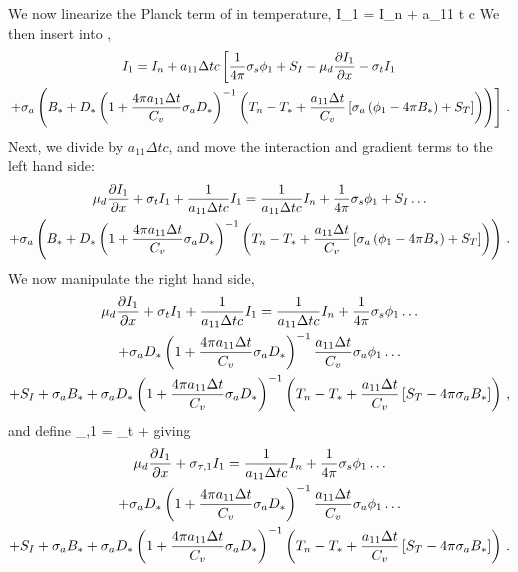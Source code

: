 We now linearize the Planck term of  in temperature,
\benum
I_1 = I_n + a_{11} \Delta t c  \pep
\label{eq:long_i_1_analytic}
\eenum
We then insert  into ,
\begin{multline}
I_1 = I_n + a_{11} \Delta t c \left[ \frac{1}{4\pi}\sigma_{s} \phi_1 + S_I - \mu_d \frac{\partial I_1}{\partial x} - \sigma_t I_1  \right. \\ 
\left. + \sigma_a \left(B_* + D_*\left(1 + \frac{4\pi a_{11} \Delta t}{C_v} \sigma_a D_*  \right)^{-1} \left( T_n - T_* + \frac{a_{11} \Delta t }{C_v} \left[ \sigma_a \left( \phi_1 - 4\pi   B_* \right) + S_T \right]  \right) \right) \right] \, .
\end{multline}
Next, we divide by $ a_{11} \Delta t c$, and move the interaction and gradient terms to the left hand side:
\begin{multline}
\mu_d \frac{\partial I_1}{\partial x} + \sigma_t I_1 + \frac{1}{a_{11} \Delta t c} I_1 = \frac{1}{a_{11} \Delta t c}I_n + \frac{1}{4\pi}\sigma_{s} \phi_1 + S_I \dots \\
+ \sigma_a \left(B_* + D_*\left(1 + \frac{4\pi a_{11} \Delta t}{C_v} \sigma_a D_*  \right)^{-1} \left( T_n - T_* + \frac{a_{11} \Delta t }{C_v} \left[ \sigma_a \left( \phi_1 - 4\pi   B_* \right) + S_T \right]  \right) \right) \, .
\end{multline}
We now manipulate the right hand side,
\begin{multline}
\mu_d \frac{\partial I_1}{\partial x} + \sigma_t I_1 + \frac{1}{a_{11} \Delta t c} I_1 = \frac{1}{a_{11} \Delta t c}I_n + \frac{1}{4\pi}\sigma_{s} \phi_1  \dots \\ 
+  \sigma_a  D_*\left(1 + \frac{4\pi a_{11} \Delta t}{C_v} \sigma_a D_*  \right)^{-1} \frac{a_{11} \Delta t }{C_v} \sigma_a \phi_1  \dots \\
+ S_I + \sigma_a B_* 
+ \sigma_a D_*\left(1 + \frac{4\pi a_{11} \Delta t}{C_v} \sigma_a D_*  \right)^{-1} \left( T_n - T_* + \frac{a_{11} \Delta t }{C_v} \left[  S_T - 4\pi \sigma_a   B_*\right]  \right) \, ,
\end{multline}
and define
\benum
\sigma_{\tau,1} = \sigma_t +  \pec
\label{eq:tau_1_analytic}
\eenum
giving
\begin{multline}
\mu_d \frac{\partial I_1}{\partial x} + \sigma_{\tau,1} I_1 = \frac{1}{a_{11} \Delta t c}I_n + \frac{1}{4\pi}\sigma_{s} \phi_1  \dots \\ 
+  \sigma_a  D_*\left(1 + \frac{4\pi a_{11} \Delta t}{C_v} \sigma_a D_*  \right)^{-1} \frac{a_{11} \Delta t }{C_v} \sigma_a \phi_1  \dots \\
+ S_I + \sigma_a B_* 
+ \sigma_a D_*\left(1 + \frac{4\pi a_{11} \Delta t}{C_v} \sigma_a D_*  \right)^{-1} \left( T_n - T_* + \frac{a_{11} \Delta t }{C_v} \left[  S_T - 4\pi \sigma_a   B_*\right]  \right) \, .
\end{multline}
